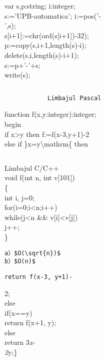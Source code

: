 var s,p:string; i:integer;\\
s:='UPB-automatica'; i:=pos('-\\
',s);\\[0pt]
s[i+1]:=chr(ord(s[i+1])-32);\\
p:=copy(s,i+1,length(s)-i);\\
delete(s,i,length(s)-i+1);\\
s:=p+'-'+s;\\
write(s);

\begin{verbatim}

\end{verbatim}

\begin{verbatim}
            Limbajul Pascal
\end{verbatim}

function f(x,y:integer):integer;\\
begin\\
if x>y then f:=f(x-3,y+1)-2\\
else if \}x=y\textbackslash mathrm\{ then

\begin{verbatim}

\end{verbatim}

Limbajul C/C++\\[0pt]
void f(int n, int v[101])\\
\{\\
int i, j=0;\\
for(i=0;i<n;i++)\\[0pt]
while(j<n \&\& v[i]<v[j])\\
j++;\\
\}

\begin{verbatim}
a）$O(\sqrt{n})$
b）$O(n)$
\end{verbatim}

\begin{verbatim}
return f(x-3, y+1)-
\end{verbatim}

2;\\
else\\
if(x==y)\\
return f(x+1, y);\\
else\\
return 3\textit{x-\\
2}y;\}

\begin{verbatim}

\end{verbatim}

